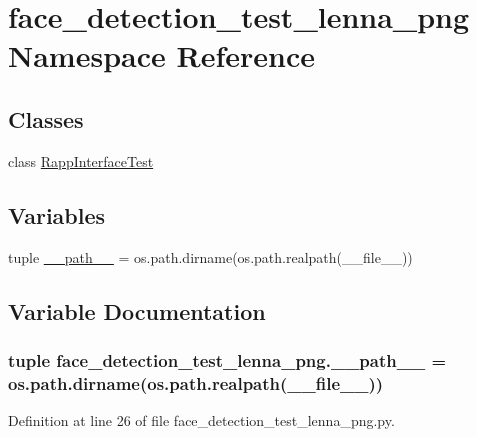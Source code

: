\hypertarget{namespaceface__detection__test__lenna__png}{\section{face\-\_\-detection\-\_\-test\-\_\-lenna\-\_\-png Namespace Reference}
\label{namespaceface__detection__test__lenna__png}
}
\subsection*{Classes}
\begin{DoxyCompactItemize}
\item 
class \hyperlink{classface__detection__test__lenna__png_1_1RappInterfaceTest}{Rapp\-Interface\-Test}
\end{DoxyCompactItemize}
\subsection*{Variables}
\begin{DoxyCompactItemize}
\item 
tuple \hyperlink{namespaceface__detection__test__lenna__png_ae9ee74c2ab4f51da994cd6fd1badf51a}{\-\_\-\-\_\-path\-\_\-\-\_\-} = os.\-path.\-dirname(os.\-path.\-realpath(\-\_\-\-\_\-file\-\_\-\-\_\-))
\end{DoxyCompactItemize}


\subsection{Variable Documentation}
\hypertarget{namespaceface__detection__test__lenna__png_ae9ee74c2ab4f51da994cd6fd1badf51a}{
\subsubsection[{\-\_\-\-\_\-path\-\_\-\-\_\-}]{\setlength{\rightskip}{0pt plus 5cm}tuple face\-\_\-detection\-\_\-test\-\_\-lenna\-\_\-png.\-\_\-\-\_\-path\-\_\-\-\_\- = os.\-path.\-dirname(os.\-path.\-realpath(\-\_\-\-\_\-file\-\_\-\-\_\-))}}\label{namespaceface__detection__test__lenna__png_ae9ee74c2ab4f51da994cd6fd1badf51a}


Definition at line 26 of file face\-\_\-detection\-\_\-test\-\_\-lenna\-\_\-png.\-py.

